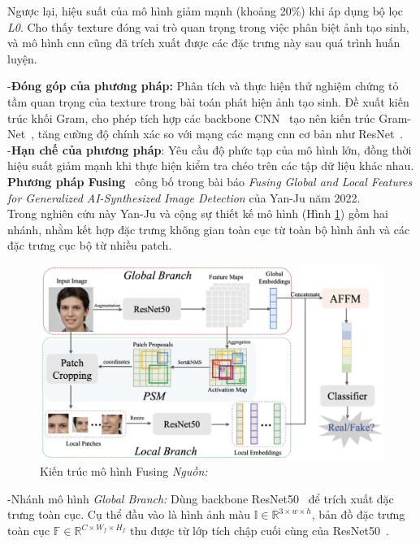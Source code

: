 Ngược lại, hiệu suất của mô hình giảm mạnh (khoảng 20\%) khi áp dụng bộ lọc \textit{L0}. Cho thấy \gls{texture} đóng vai trò quan trọng trong việc phân biệt ảnh tạo sinh, và mô hình \gls{cnn} cũng đã trích xuất được các đặc trưng này sau quá trình huấn luyện.

%
%
-\textbf{Đóng góp của phương pháp:}
Phân tích và thực hiện thử nghiệm chứng tỏ tầm quan trọng của \gls{texture} trong bài toán phát hiện ảnh tạo sinh.
%
Đề xuất kiến trúc khối Gram, cho phép tích hợp các \gls{backbone} CNN~\cite{Krizhevsky2012ImageNetCW} tạo nên kiến trúc Gram-Net~\cite{9157447}, tăng cường độ chính xác so với mạng các mạng \gls{cnn} cơ bản như ResNet~\cite{He2015DeepRL}.\\
%
-\textbf{Hạn chế của phương pháp}:
Yêu cầu độ phức tạp của mô hình lớn, đồng thời hiệu suất giảm mạnh khi thực hiện kiểm tra chéo trên các tập dữ liệu khác nhau.\\
%
\textbf{Phương pháp Fusing}~\cite{9897820} công bố trong bài báo \textit{Fusing Global and Local Features for Generalized AI-Synthesized Image Detection} của Yan-Ju năm 2022.\\
Trong nghiên cứu này Yan-Ju và cộng sự thiết kế mô hình (Hình \ref{fig:model-fusing-architecture-1}) gồm hai nhánh, nhằm kết hợp đặc trưng không gian toàn cục từ toàn bộ hình ảnh và các đặc trưng cục bộ từ nhiều \gls{patch}.
%
\begin{figure}[h]
	\centering
	\includegraphics[width=1.0\linewidth]{Images/model-fusing-architecture-1.png}
	\begin{minipage}{0.9\linewidth}
		\caption{Kiến trúc mô hình Fusing \textit{Nguồn: \cite{9897820}}}
		\label{fig:model-fusing-architecture-1}
	\end{minipage}
\end{figure}
%

-Nhánh mô hình \textit{Global Branch:} 
%
Dùng \gls{backbone} ResNet50~\cite{He2015DeepRL} để trích xuất đặc trưng toàn cục. Cụ thể đầu vào là hình ảnh màu $\mathbb{I} \in \mathbb{R}^{3 \times w \times h}$, bản đồ đặc trưng toàn cục $\mathbb{F} \in \mathbb{R}^{C \times W_f \times H_f}$ thu được từ lớp tích chập cuối cùng của ResNet50~\cite{He2015DeepRL}.

